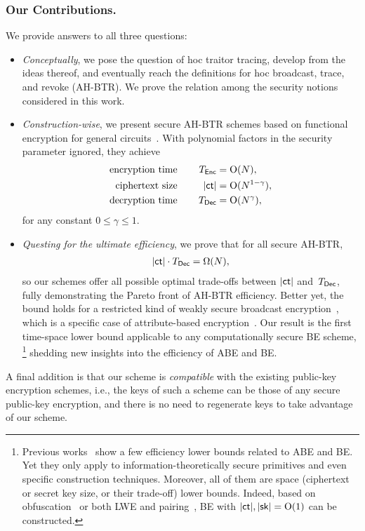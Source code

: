 \subsubsection{Our Contributions.}
We provide answers to all three questions:
\begin{itemize}
\item \emph{Conceptually}, we pose the question of \ad hoc traitor tracing,
develop from the ideas thereof, and
eventually reach the definitions for \ad hoc broadcast, trace, and revoke (AH-BTR).
We prove the relation among the security notions considered in this work.
\item \emph{Construction-wise},
we present secure AH-BTR schemes based on functional encryption for general circuits~\cite{TCC:BonSahWat11}.
With polynomial factors in the security parameter ignored,
they achieve
\begin{align*}
\textup{encryption time}\qquad\qquad\mathllap{T_\Enc}&{}=\bigO(N),\\
\textup{ciphertext size}\qquad\qquad\mathllap{|\ct|}&{}=\bigO(N^{1-\gamma}),\\
\textup{decryption time}\qquad\qquad\mathllap{T_\Dec}&{}=\bigO(N^\gamma),
\end{align*}
for any constant ${0\leq\gamma\leq 1}$.
\item \emph{Questing for the ultimate efficiency},
we prove that for all secure AH-BTR,
\begin{align*}
|\ct|\cdot\TDec=\bigOmega(N),
\end{align*}
so our schemes offer all possible optimal trade-offs between $|\ct|$ and~$\TDec$,
fully demonstrating the Pareto front of AH-BTR efficiency.
Better yet, the bound holds for a restricted kind of weakly secure broadcast encryption~\cite{C:FiaNao93},
which is a specific case of attribute-based encryption~\cite{EC:SahWat05,CCS:GPSW06}.
Our result is the first time-space lower bound applicable to any computationally secure BE scheme,%
\footnote{Previous works~\cite{EC:BluCre94,EC:LubSta98,AC:KYDB98,AFRICACRYPT:AusKre08,AC:KatYer09,C:GayKerWee15,ITC:DLY21} show a few efficiency lower bounds related to ABE and BE.
Yet they only apply to information-theoretically secure primitives and even specific construction techniques.
Moreover, all of them are space (ciphertext or secret key size, or their trade-off) lower bounds.
Indeed, based on obfuscation~\cite{C:BonWatZha14} or both LWE and pairing~\cite{EC:AgrYam20}, BE with ${|\ct|,|\sk|=\bigO(1)}$ can be constructed.}
shedding new insights into the efficiency of ABE and BE.
\end{itemize}
A final addition is that our scheme is \emph{compatible} with the existing public-key encryption schemes,
i.e., the keys of such a scheme can be those of any secure public-key encryption, and
there is no need to regenerate keys to take advantage of our scheme.
